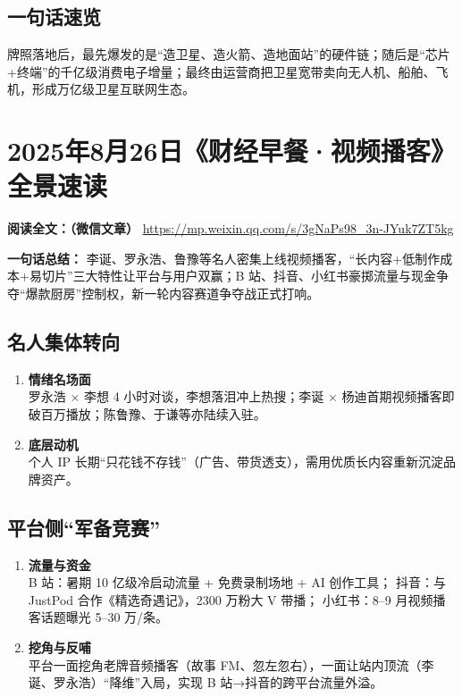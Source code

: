 \subsection{一句话速览}
牌照落地后，最先爆发的是“造卫星、造火箭、造地面站”的硬件链；随后是“芯片+终端”的千亿级消费电子增量；最终由运营商把卫星宽带卖向无人机、船舶、飞机，形成万亿级卫星互联网生态。


\section{2025年8月26日《财经早餐·视频播客》全景速读}
\vspace{1cm}
\noindent\textbf{阅读全文：（微信文章）} \url{
https://mp.weixin.qq.com/s/3gNaPs98_3n-JYuk7ZT5kg}

\textbf{一句话总结：}  
李诞、罗永浩、鲁豫等名人密集上线视频播客，“长内容+低制作成本+易切片”三大特性让平台与用户双赢；B 站、抖音、小红书豪掷流量与现金争夺“爆款厨房”控制权，新一轮内容赛道争夺战正式打响。

\subsection{名人集体转向}
\begin{enumerate}[leftmargin=*, nosep]
  \item \textbf{情绪名场面} \\
  罗永浩 × 李想 4 小时对谈，李想落泪冲上热搜；李诞 × 杨迪首期视频播客即破百万播放；陈鲁豫、于谦等亦陆续入驻。
  \item \textbf{底层动机} \\
  个人 IP 长期“只花钱不存钱”（广告、带货透支），需用优质长内容重新沉淀品牌资产。
\end{enumerate}

\subsection{平台侧“军备竞赛”}
\begin{enumerate}[leftmargin=*, nosep]
  \item \textbf{流量与资金} \\
  B 站：暑期 10 亿级冷启动流量 + 免费录制场地 + AI 创作工具；  
  抖音：与 JustPod 合作《精选奇遇记》，2300 万粉大 V 带播；  
  小红书：8–9 月视频播客话题曝光 5–30 万/条。
  \item \textbf{挖角与反哺} \\
  平台一面挖角老牌音频播客（故事 FM、忽左忽右），一面让站内顶流（李诞、罗永浩）“降维”入局，实现 B 站→抖音的跨平台流量外溢。
\end{enumerate}


